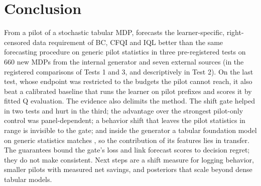 \section{Conclusion}
\label{sec:conclusion}
From a pilot of a stochastic tabular MDP, \OEH{} forecasts the learner-specific, right-censored data requirement of BC, CFQI and IQL better than the same forecasting procedure on generic pilot statistics in three pre-registered tests on 660 new MDPs from the internal generator and seven external sources (in the registered comparisons of Tests 1 and 3, and descriptively in Test 2). On the last test, whose endpoint was restricted to the budgets the pilot cannot reach, it also beat a calibrated baseline that runs the learner on pilot prefixes and scores it by fitted Q evaluation. The evidence also delimits the method. The shift gate helped in two tests and hurt in the third; the advantage over the strongest pilot-only control was panel-dependent; a behavior shift that leaves the pilot statistics in range is invisible to the gate; and inside the generator a tabular foundation model on generic statistics matches \OEH{}, so the contribution of its features lies in transfer. The guarantees bound the gate's loss and link forecast scores to decision regret; they do not make \OEH{} consistent. Next steps are a shift measure for logging behavior, smaller pilots with measured net savings, and posteriors that scale beyond dense tabular models.
